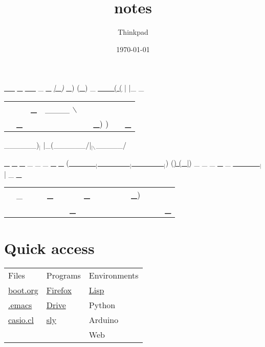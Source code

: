 \documentclass[11pt]{article}
\author{Thinkpad}
\date{\today}
\title{notes}
\begin{document}
\maketitle
\tableofcontents

 \uline{\uline{\_\_}} \uline{\uline{\uline{\_}}}  \uline{\uline{\_\_}} \_ \uline{\uline{\uline{\_}}} 
\emph{\uline{\uline{\uline{\uline{\uline{\uline{|\_}}}}}})} \uline{\uline{\_}}) (\uline{\uline{\uline{\_}}})
\_       \uline{\uline{\uline{\uline{\_\_\_( (}}}} | |\_     \_ 
\begin{center}
\begin{tabular}{llllllll}
 &  & \uline{\_} & \_\_\_\_ $\backslash$ &  &  &  & \\
 & \uline{\uline{\_}} &  &  &  & \uline{\uline{\_}}) ) &  & \uline{\_} & \\
\end{tabular}
\end{center}
\_\_\_\_\_\_)$_{\text{|}}$   |\_(\_\_\_\_\_\_/|$_{\text{|$\backslash$}}$\_\_\_\_\_/ 

\uline{\uline{\uline{\_}}} \uline{\uline{\uline{\_}}} \uline{\uline{\uline{\_}}} \_     \_ \_ \uline{\uline{\uline{\_}}} \uline{\uline{\uline{\_}}} 
                            (\uline{\_\_\_\_\_$_{\text{|}}$\_\_\_\_\_\_$_{\text{|}}$\_\_\_\_\_\_$_{\text{|}}$})   (\uline{) (\uline{\uline{\uline{\uline{\uline{\uline{\_|}}}}}}})
\_  \_  \_ \uline{\uline{\uline{\_}}} \_       \uline{\_\_\_\_\_$_{\text{|}}$ |}     \_ \uline{\uline{\_}}   
\begin{center}
\begin{tabular}{lllllllllllll}
 & \_ &  &  & \uline{\_} &  &  & \uline{\_} &  &  &  &  & \uline{\_})\\
 &  &  &  &  &  & \uline{\uline{\_}} &  &  &  &  &  &  &  &  & \uline{\uline{\_}}\\
\end{tabular}
\end{center}





\section{Quick access}
\label{sec-1}

\begin{center}
\begin{tabular}{lll}
Files & Programs & Environments\\
\href{file://c:/Users/principal/AppData/Roaming/.emacs.d/CASIOMACHINE/boot.org}{boot.org} & \href{(browse-url-firefox\%20"https://www.duckduckgo.com")}{Firefox} & \href{(lisp)}{Lisp}\\
\href{file://c:/Users/principal/AppData/Roaming/.emacs}{.emacs} & \href{(browse-url-firefox\%20"drive.google.com")}{Drive} & Python\\
\href{file://c:/Users/principal/AppData/Roaming/.emacs.d/casio.cl}{casio.cl} & \href{(other-window\%20(sly))}{sly} & Arduino\\
 &  & Web\\
\end{tabular}
\end{center}
\end{document}
